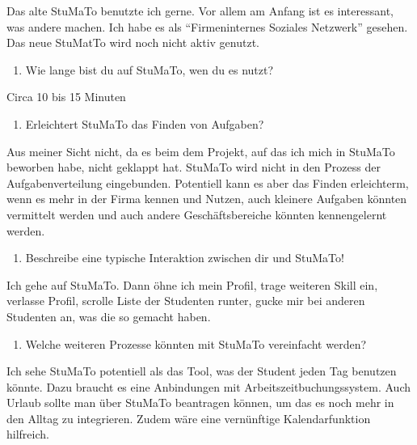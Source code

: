 \documentclass[
  12pt,
  ngerman,
  a4paper,
]{article}
\providecommand{\tightlist}{%
  \setlength{\itemsep}{0pt}\setlength{\parskip}{0pt}}
\begin{document}
Das alte StuMaTo benutzte ich gerne. Vor allem am Anfang ist es
interessant, was andere machen. Ich habe es als ``Firmeninternes
Soziales Netzwerk'' gesehen. Das neue StuMatTo wird noch nicht aktiv
genutzt.

\begin{enumerate}
\def\labelenumi{\arabic{enumi}.}
\setcounter{enumi}{12}
\tightlist
\item
  Wie lange bist du auf StuMaTo, wen du es nutzt?
\end{enumerate}

Circa 10 bis 15 Minuten

\begin{enumerate}
\def\labelenumi{\arabic{enumi}.}
\setcounter{enumi}{13}
\tightlist
\item
  Erleichtert StuMaTo das Finden von Aufgaben?
\end{enumerate}

Aus meiner Sicht nicht, da es beim dem Projekt, auf das ich mich in
StuMaTo beworben habe, nicht geklappt hat. StuMaTo wird nicht in den
Prozess der Aufgabenverteilung eingebunden. Potentiell kann es aber das
Finden erleichterm, wenn es mehr in der Firma kennen und Nutzen, auch
kleinere Aufgaben könnten vermittelt werden und auch andere
Geschäftsbereiche könnten kennengelernt werden.

\begin{enumerate}
\def\labelenumi{\arabic{enumi}.}
\setcounter{enumi}{14}
\tightlist
\item
  Beschreibe eine typische Interaktion zwischen dir und StuMaTo!
\end{enumerate}

Ich gehe auf StuMaTo. Dann öhne ich mein Profil, trage weiteren Skill
ein, verlasse Profil, scrolle Liste der Studenten runter, gucke mir bei
anderen Studenten an, was die so gemacht haben.

\begin{enumerate}
\def\labelenumi{\arabic{enumi}.}
\setcounter{enumi}{15}
\tightlist
\item
  Welche weiteren Prozesse könnten mit StuMaTo vereinfacht werden?
\end{enumerate}

Ich sehe StuMaTo potentiell als das Tool, was der Student jeden Tag
benutzen könnte. Dazu braucht es eine Anbindungen mit
Arbeitszeitbuchungssystem. Auch Urlaub sollte man über StuMaTo
beantragen können, um das es noch mehr in den Alltag zu integrieren.
Zudem wäre eine vernünftige Kalendarfunktion hilfreich.
\end{document}

